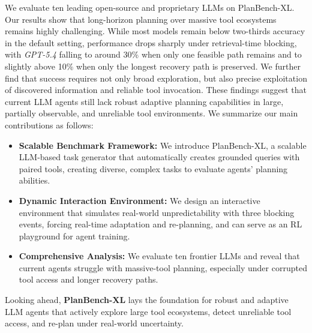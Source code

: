 \documentclass{llmxive}
\providecommand{\BENCH}[1]{\textbf{PlanBench-XL}}
\providecommand{\bench}[1]{PlanBench-XL}
\begin{document}
We evaluate ten leading open-source and proprietary LLMs on \bench{}. 
Our results show that long-horizon planning over massive tool ecosystems remains highly challenging. 
While most models remain below two-thirds accuracy in the default setting, performance drops sharply under retrieval-time blocking, with \textit{GPT-5.4} falling to around 30\% when only one feasible path remains and to slightly above 10\% when only the longest recovery path is preserved.
We further find that success requires not only broad exploration, but also precise exploitation of discovered information and reliable tool invocation. 
These findings suggest that current LLM agents still lack robust adaptive planning capabilities in large, partially observable, and unreliable tool environments.
We summarize our main contributions as follows:
\begin{itemize}[topsep=3pt, partopsep=1.5pt, leftmargin=*, itemsep=-4.5pt]
    \item \textbf{Scalable Benchmark Framework:} We introduce \bench{}, a scalable LLM-based task generator that automatically creates grounded queries with paired tools, creating diverse, complex tasks to evaluate agents’ planning abilities.
    
    \item \textbf{Dynamic Interaction Environment:} We design an interactive environment that simulates real-world unpredictability with three blocking events, forcing real-time adaptation and re-planning, and can serve as an RL playground for agent training.
    
    \item \textbf{Comprehensive Analysis:} We evaluate ten frontier LLMs and reveal that current agents struggle with massive-tool planning, especially under corrupted tool access and longer recovery paths.
\end{itemize}
Looking ahead, \BENCH{} lays the foundation for robust and adaptive LLM agents that actively explore large tool ecosystems, detect unreliable tool access, and re-plan under real-world uncertainty.
\end{document}
